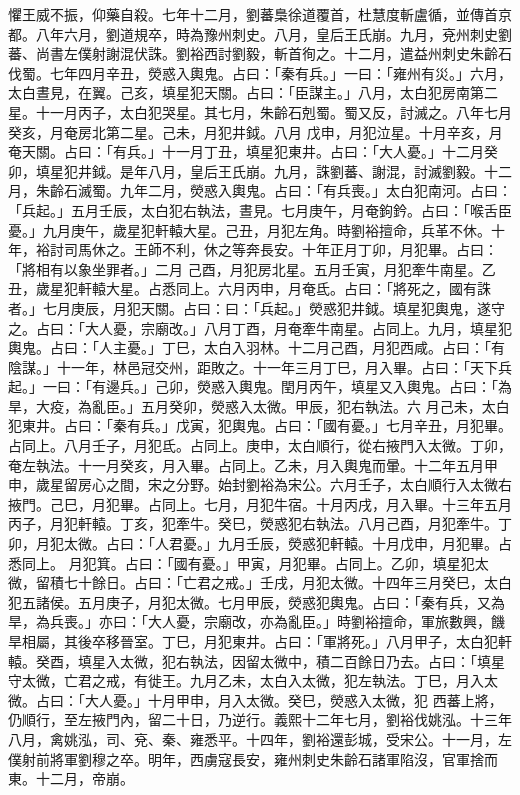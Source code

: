 \begin{pinyinscope}
 懼王威不振，仰藥自殺。七年十二月，劉蕃梟徐道覆首，杜慧度斬盧循，並傳首京都。八年六月，劉道規卒，時為豫州刺史。八月，皇后王氏崩。九月，兗州刺史劉蕃、尚書左僕射謝混伏誅。劉裕西討劉毅，斬首徇之。十二月，遣益州刺史朱齡石伐蜀。七年四月辛丑，熒惑入輿鬼。占曰：「秦有兵。」一曰：「雍州有災。」六月，太白晝見，在翼。己亥，填星犯天關。占曰：「臣謀主。」八月，太白犯房南第二星。十一月丙子，太白犯哭星。其七月，朱齡石剋蜀。蜀又反，討滅之。八年七月癸亥，月奄房北第二星。己未，月犯井鉞。八月
 戊申，月犯泣星。十月辛亥，月奄天關。占曰：「有兵。」十一月丁丑，填星犯東井。占曰：「大人憂。」十二月癸卯，填星犯井鉞。是年八月，皇后王氏崩。九月，誅劉蕃、謝混，討滅劉毅。十二月，朱齡石滅蜀。九年二月，熒惑入輿鬼。占曰：「有兵喪。」太白犯南河。占曰：「兵起。」五月壬辰，太白犯右執法，晝見。七月庚午，月奄鉤鈐。占曰：「喉舌臣憂。」九月庚午，歲星犯軒轅大星。己丑，月犯左角。時劉裕擅命，兵革不休。十年，裕討司馬休之。王師不利，休之等奔長安。十年正月丁卯，月犯畢。占曰：「將相有以象坐罪者。」二月
 己酉，月犯房北星。五月壬寅，月犯牽牛南星。乙丑，歲星犯軒轅大星。占悉同上。六月丙申，月奄氐。占曰：「將死之，國有誅者。」七月庚辰，月犯天關。占曰：曰：「兵起。」熒惑犯井鉞。填星犯輿鬼，遂守之。占曰：「大人憂，宗廟改。」八月丁酉，月奄牽牛南星。占同上。九月，填星犯輿鬼。占曰：「人主憂。」丁巳，太白入羽林。十二月己酉，月犯西咸。占曰：「有陰謀。」十一年，林邑冠交州，距敗之。十一年三月丁巳，月入畢。占曰：「天下兵起。」一曰：「有邊兵。」己卯，熒惑入輿鬼。閏月丙午，填星又入輿鬼。占曰：「為旱，大疫，為亂臣。」五月癸卯，熒惑入太微。甲辰，犯右執法。六
 月己未，太白犯東井。占曰：「秦有兵。」戊寅，犯輿鬼。占曰：「國有憂。」七月辛丑，月犯畢。占同上。八月壬子，月犯氐。占同上。庚申，太白順行，從右掖門入太微。丁卯，奄左執法。十一月癸亥，月入畢。占同上。乙未，月入輿鬼而暈。十二年五月甲申，歲星留房心之間，宋之分野。始封劉裕為宋公。六月壬子，太白順行入太微右掖門。己巳，月犯畢。占同上。七月，月犯牛宿。十月丙戌，月入畢。十三年五月丙子，月犯軒轅。丁亥，犯牽牛。癸巳，熒惑犯右執法。八月己酉，月犯牽牛。丁卯，月犯太微。占曰：「人君憂。」九月壬辰，熒惑犯軒轅。十月戊申，月犯畢。占悉同上。
 月犯箕。占曰：「國有憂。」甲寅，月犯畢。占同上。乙卯，填星犯太微，留積七十餘日。占曰：「亡君之戒。」壬戌，月犯太微。十四年三月癸巳，太白犯五諸侯。五月庚子，月犯太微。七月甲辰，熒惑犯輿鬼。占曰：「秦有兵，又為旱，為兵喪。」亦曰：「大人憂，宗廟改，亦為亂臣。」時劉裕擅命，軍旅數興，饑旱相屬，其後卒移晉室。丁巳，月犯東井。占曰：「軍將死。」八月甲子，太白犯軒轅。癸酉，填星入太微，犯右執法，因留太微中，積二百餘日乃去。占曰：「填星守太微，亡君之戒，有徙王。九月乙未，太白入太微，犯左執法。丁巳，月入太微。占曰：「大人憂。」十月甲申，月入太微。癸巳，熒惑入太微，犯
 西蕃上將，仍順行，至左掖門內，留二十日，乃逆行。義熙十二年七月，劉裕伐姚泓。十三年八月，禽姚泓，司、兗、秦、雍悉平。十四年，劉裕還彭城，受宋公。十一月，左僕射前將軍劉穆之卒。明年，西虜寇長安，雍州刺史朱齡石諸軍陷沒，官軍捨而東。十二月，帝崩。




\end{pinyinscope}
